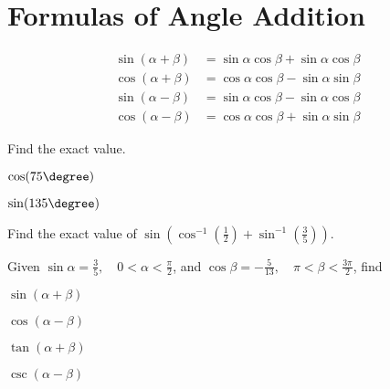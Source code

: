 \newpage

\section{Formulas of Angle Addition}
\begin{theorem}
\begin{align*}
\sin(\alpha+\beta) & =\sin \alpha \cos \beta + \sin \alpha \cos \beta\\
\cos(\alpha+\beta) & =\cos \alpha \cos \beta-\sin \alpha \sin \beta\\
\sin(\alpha-\beta) &=\sin \alpha \cos \beta -  \sin \alpha \cos \beta\\
\cos(\alpha-\beta) &=\cos \alpha \cos \beta+\sin \alpha \sin \beta
\end{align*}  
\end{theorem}


\begin{example}
  Find the exact value.\\
  \begin{enumerate*}
    \item $\cos(75\degree)$
    \item $\sin(135\degree)$\hfill\null
  \end{enumerate*}
\end{example}


\begin{example}
  Find the exact value of $\sin\left ({\cos}^{-1}\left(\frac{1}{2}\right)+{\sin}^{-1}\left(\frac{3}{5}\right)\right)$.
\end{example}

\newpage

\begin{example}
  Given $\sin \alpha=\frac{3}{5}, \quad 0<\alpha<\frac{\pi}{2}$, and $\cos \beta=-\frac{5}{13}, \quad \pi<\beta<\frac{3\pi}{2}$, find\\
  \begin{enumerate*}
    \item $\sin(\alpha+\beta)$
    \item $\cos(\alpha-\beta)$
    \item $\tan(\alpha+\beta)$
    \item $\csc(\alpha-\beta)$\hfill\null
  \end{enumerate*}
\end{example}


